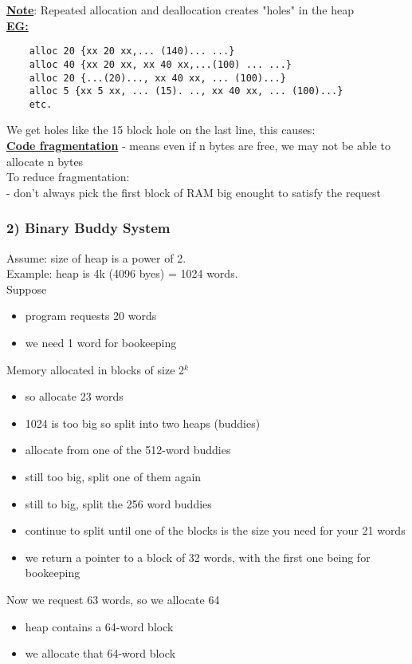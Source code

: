 \documentclass[12pt]{article}
\newcommand{\myt}[1]{\textbf{\underline{#1}}}
\begin{document}
	\myt{Note}: Repeated allocation and deallocation creates "holes" in the heap\\
	\myt{EG:}\\
	\begin{verbatim}
	alloc 20 {xx 20 xx,... (140)... ...}
	alloc 40 {xx 20 xx, xx 40 xx,...(100) ... ...}
	alloc 20 {...(20)..., xx 40 xx, ... (100)...}
	alloc 5 {xx 5 xx, ... (15). .., xx 40 xx, ... (100)...}
	etc.
	\end{verbatim}
	
	We get holes like the 15 block hole on the last line, this causes:\\
	\myt{Code fragmentation} - means even if n bytes are free, we may not be able to allocate n bytes\\
	
	To reduce fragmentation:\\
	- don't always pick the first block of RAM big enought to satisfy the request\\
	
	\subsubsection*{2) Binary Buddy System}
	Assume: size of heap is a power of 2.\\
	Example: heap is 4k (4096 byes) = 1024 words.\\
	
	Suppose
	\begin{itemize}
		\item program requests 20 words
		\item we need 1 word for bookeeping
	\end{itemize}
	
	Memory allocated in blocks of size 2$^k$
	\begin{itemize}
		\item so allocate 23 words
		\item 1024 is too big so split into two heaps (buddies)
		\item allocate from one of the 512-word buddies
		\item still too big, split one of them again
		\item still to big, split the 256 word buddies
		\item continue to split until one of the blocks is the size you need for your 21 words
		\item we return a pointer to a block of 32 words, with the first one being for bookeeping
	\end{itemize}
	Now we request 63 words, so we allocate 64
	\begin{itemize}
		\item heap contains a 64-word block
		\item we allocate that 64-word block
	\end{itemize}
	
\end{document}
